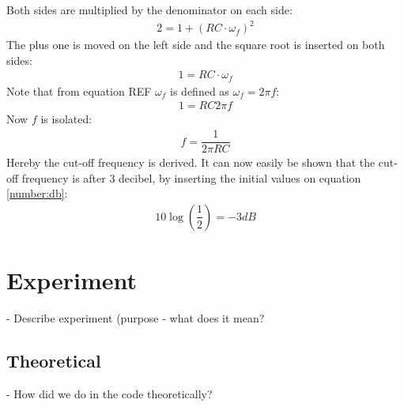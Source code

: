 Both sides are multiplied by the denominator on each side:
\begin{align*}
2 = 1+ \left(RC \cdot \omega_f \right)^2
\end{align*}
The plus one is moved on the left side and the square root is inserted on both sides:
\begin{align*}
1 = RC \cdot \omega_f 
\end{align*}
Note that from equation REF $\omega_f$ is defined as $\omega_f=2 \pi f$:
\begin{align*}
1 = RC 2\pi f 
\end{align*}
Now $f$ is isolated:
\begin{align*}
f=\dfrac{1}{2\pi RC}
\end{align*}
Hereby the cut-off frequency is derived. It can now easily be shown that the cut-off frequency is after 3 decibel, by inserting the initial values on equation \ref{number:db}:
\begin{align*}
10 \log \left(\dfrac{1}{2} \right) = -3 dB
\end{align*}
\section{Experiment} \label{experiment}
- Describe experiment (purpose - what does it mean?
\subsection{Theoretical}
- How did we do in the code theoretically?
